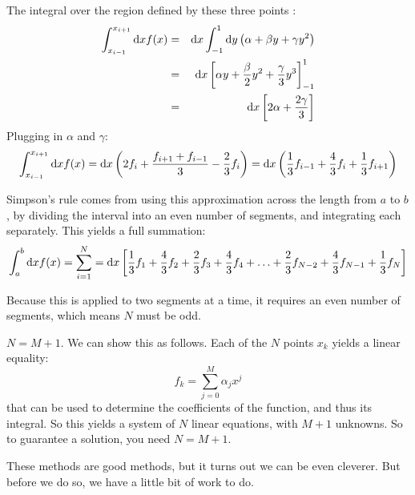 \begin{answer}
The integral over the region defined by these three points :
\begin{eqnarray}
  \int_{x_{i-1}}^{x_{i+1}} {\rm d}x f(x) &=& {\rm d}x \int_{-1}^{1} {\rm
    d}y \left(\alpha + \beta y + \gamma y^2\right) \cr
  &=& {\rm d}x \left[\alpha y + \frac{\beta}{2} y^2 + \frac{\gamma}{3}
    y^3\right]_{-1}^{1}  \cr
  &=& {\rm d}x \left[2 \alpha + \frac{2\gamma}{3}\right]
\end{eqnarray}
Plugging in $\alpha$ and $\gamma$:
\begin{equation}
  \int_{x_{i-1}}^{x_{i+1}} {\rm d}x f(x)
  = {\rm d}x \left(2 f_i +
  \frac{f_{i+1} + f_{i-1}}{3} - \frac{2}{3} f_i\right) 
  = {\rm d}x \left(\frac{1}{3} f_{i-1}
  + \frac{4}{3} f_i 
  + \frac{1}{3} f_{i+1}\right)
\end{equation}
\end{answer}

Simpson's rule comes from using this approximation across the length
from $a$ to $b$, by dividing the interval into an even number of
segments, and integrating each separately. This yields a full
summation:
\begin{equation}
  \int_a^b {\rm d}x f(x) = \sum_{i=1}^N = {\rm d}x \left[\frac{1}{3}
    f_1 + \frac{4}{3} f_2 + \frac{2}{3} f_3 + \frac{4}{3} f_4 + \ldots
    + \frac{2}{3} f_{N-2} + \frac{4}{3} f_{N-1} + \frac{1}{3} f_N
    \right]
\end{equation}

Because this is applied to two segments at a time, it requires an even
number of segments, which means $N$ must be odd.


\begin{answer}
$N = M + 1$. We can show this as follows. Each of the $N$ points $x_k$
  yields a linear equality:
\begin{equation}
\label{eq:weights}
 f_k = \sum_{j=0}^M \alpha_j x^j
\end{equation}
that can be used to determine the coefficients of the function, and
thus its integral.  So this yields a system of $N$ linear equations,
with $M+1$ unknowns. So to guarantee a solution, you need $N=M+1$.
\end{answer}

These methods are good methods, but it turns out we can be even
cleverer. But before we do so, we have a little bit of work to do.

